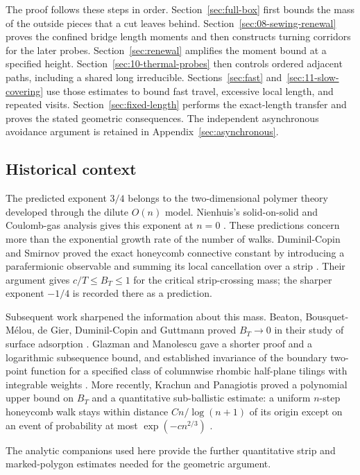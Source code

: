 The proof follows these steps in order. Section~\ref{sec:full-box}
first bounds the mass of the outside pieces that a cut leaves behind.
Section~\ref{sec:08-sewing-renewal} proves the confined bridge length
moments and then constructs turning corridors for the later probes.
Section~\ref{sec:renewal} amplifies the moment bound at a specified
height. Section~\ref{sec:10-thermal-probes} then controls
ordered adjacent paths, including a shared long irreducible.
Sections~\ref{sec:fast} and~\ref{sec:11-slow-covering} use those estimates
to bound fast travel, excessive local length, and repeated visits.
Section~\ref{sec:fixed-length} performs the exact-length transfer and
proves the stated geometric consequences. The independent asynchronous
avoidance argument is retained in Appendix~\ref{sec:asynchronous}.


\subsection{Historical context}
The predicted exponent $3/4$ belongs to the two-dimensional polymer
theory developed through the dilute $O(n)$ model. Nienhuis's
solid-on-solid and Coulomb-gas analysis gives this exponent at $n=0$
\cite{Nienhuis1982}. These predictions concern more than the exponential
growth rate of the number of walks. Duminil-Copin and Smirnov proved the
exact honeycomb connective constant by introducing a parafermionic
observable and summing its local cancellation over a strip
\cite{DCS2012}. Their argument gives $c/T\le B_T\le1$ for the critical
strip-crossing mass; the sharper exponent $-1/4$ is recorded there as a
prediction.

Subsequent work sharpened the information about this mass.
Beaton, Bousquet-M\'elou, de Gier, Duminil-Copin and Guttmann proved
$B_T\to0$ in their study of surface adsorption \cite{BeatonEtAl2014}.
Glazman and Manolescu gave a shorter proof and a logarithmic subsequence
bound, and established invariance of the boundary two-point function
for a specified class of columnwise rhombic half-plane tilings
with integrable weights \cite{GlazmanManolescu2020}. More recently,
Krachun and Panagiotis proved
a polynomial upper bound on $B_T$ and a quantitative sub-ballistic
estimate: a uniform $n$-step honeycomb walk stays within distance
$C n/\log(n+1)$ of its origin except on an event of probability at most
$\exp(-c n^{2/3})$ \cite{KrachunPanagiotis2026}.

The analytic companions used here provide the further quantitative strip
and marked-polygon estimates needed for the geometric argument.

